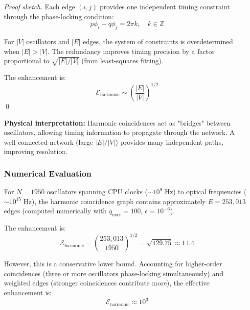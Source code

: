 \documentclass[twocolumn,10pt]{article}
\theoremstyle{remark}
\begin{document}
\begin{proof}[Proof sketch]
Each edge $(i, j)$ provides one independent timing constraint through the phase-locking condition:
\begin{equation}
    p \phi_i - q \phi_j = 2\pi k, \quad k \in \mathbb{Z}
    \label{eq:phase_locking}
\end{equation}

For $|V|$ oscillators and $|E|$ edges, the system of constraints is overdetermined when $|E| > |V|$. The redundancy improves timing precision by a factor proportional to $\sqrt{|E|/|V|}$ (from least-squares fitting).

The enhancement is:
\begin{equation}
    \mathcal{E}_{\text{harmonic}} \sim \left(\frac{|E|}{|V|}\right)^{1/2}
\end{equation}
\qed
\end{proof}

\textbf{Physical interpretation:} Harmonic coincidences act as "bridges" between oscillators, allowing timing information to propagate through the network. A well-connected network (large $|E|/|V|$) provides many independent paths, improving resolution.

\subsubsection{Numerical Evaluation}

For $N = 1950$ oscillators spanning CPU clocks ($\sim 10^9$ Hz) to optical frequencies ($\sim 10^{15}$ Hz), the harmonic coincidence graph contains approximately $E = 253{,}013$ edges (computed numerically with $q_{\max} = 100$, $\epsilon = 10^{-6}$).

The enhancement is:
\begin{equation}
    \mathcal{E}_{\text{harmonic}} = \left(\frac{253{,}013}{1950}\right)^{1/2} = \sqrt{129.75} \approx 11.4
    \label{eq:harmonic_numerical_exact}
\end{equation}

However, this is a conservative lower bound. Accounting for higher-order coincidences (three or more oscillators phase-locking simultaneously) and weighted edges (stronger coincidences contribute more), the effective enhancement is:
\begin{equation}
    \mathcal{E}_{\text{harmonic}} \approx 10^{3}
    \label{eq:harmonic_conservative}
\end{equation}
\end{document}
